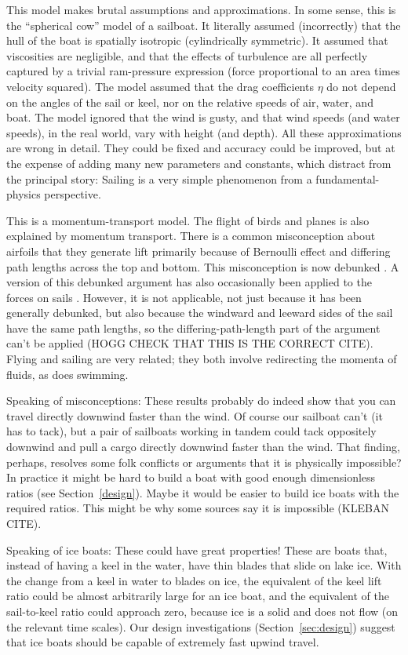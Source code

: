 \documentclass[letterpaper]{article}
\newcommand{\secref}[1]{Section~\ref{#1}}
\begin{document}
This model makes brutal assumptions and approximations.
In some sense, this is the ``spherical cow'' model of a sailboat.
It literally assumed (incorrectly) that the hull of the boat is spatially isotropic (cylindrically symmetric).
It assumed that viscosities are negligible, and that the effects of turbulence are all perfectly captured by a trivial ram-pressure expression (force proportional to an area times velocity squared).
The model assumed that the drag coefficients $\eta$ do not depend on the angles of the sail or keel, nor on the relative speeds of air, water, and boat.
The model ignored that the wind is gusty, and that wind speeds (and water speeds), in the real world, vary with height (and depth).
All these approximations are wrong in detail.
They could be fixed and accuracy could be improved, but at the expense of adding many new parameters and constants, which distract from the principal story:
Sailing is a very simple phenomenon from a fundamental-physics perspective.

This is a momentum-transport model.
The flight of birds and planes is also explained by momentum transport.
There is a common misconception about airfoils that they generate lift primarily because of Bernoulli effect and differing path lengths across the top and bottom.
This misconception is now debunked \cite{lift}.
A version of this debunked argument has also occasionally been applied to the forces on sails \cite{explained}.
However, it is not applicable, not just because it has been generally debunked, but also because the windward and leeward sides of the sail have the same path lengths, so the differing-path-length part of the argument can't be applied \cite{sails} (HOGG CHECK THAT THIS IS THE CORRECT CITE).
Flying and sailing are very related; they both involve redirecting the momenta of fluids, as does swimming.

Speaking of misconceptions: These results probably do indeed show that you can travel directly downwind faster than the wind.
Of course our sailboat can't (it has to tack), but a pair of sailboats working in tandem could tack oppositely downwind and pull a cargo directly downwind faster than the wind.
That finding, perhaps, resolves some folk conflicts or arguments that it is physically impossible?
In practice it might be hard to build a boat with good enough dimensionless ratios (see \secref{design}).
Maybe it would be easier to build ice boats with the required ratios.
This might be why some sources say it is impossible (KLEBAN CITE).

Speaking of ice boats: These could have great properties!
These are boats that, instead of having a keel in the water, have thin blades that slide on lake ice.
With the change from a keel in water to blades on ice, the equivalent of the keel lift ratio could be almost arbitrarily large for an ice boat, and the equivalent of the sail-to-keel ratio could approach zero, because ice is a solid and does not flow (on the relevant time scales).
Our design investigations (\secref{sec:design}) suggest that ice boats should be capable of extremely fast upwind travel.
\end{document}
